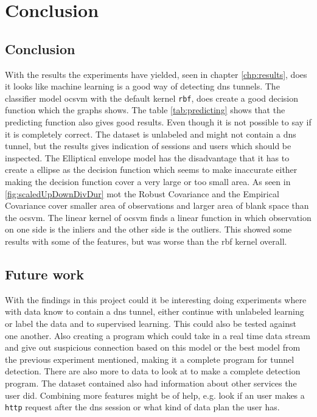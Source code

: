\chapter{Conclusion}
\label{chp:conclusion}

\section{Conclusion}
With the results the experiments have yielded, seen in chapter \ref{chp:results}, does it looks like machine learning is a good way of detecting \gls{dns} tunnels. The classifier model \gls{ocsvm} with the default kernel \texttt{rbf}, does create a good decision function which the graphs shows. The table \ref{tab:predicting} shows that the predicting function also gives good results. Even though it is not possible to say if it is completely correct. The dataset is unlabeled and might not contain a \gls{dns} tunnel, but the results gives indication of sessions and users which should be inspected. The Elliptical envelope model has the disadvantage that it has to create a ellipse as the decision function which seems to make inaccurate either making the decision function cover a very large or too small area. As seen in \ref{fig:scaledUpDownDivDur} mot the Robust Covariance and the Empirical Covariance cover smaller area of observations and larger area of blank space than the \gls{ocsvm}. The linear kernel of \gls{ocsvm} finds a linear function in which observation on one side is the inliers and the other side is the outliers. This showed some results with some of the features, but was worse than the rbf kernel overall.


\section{Future work}
With the findings in this project could it be interesting doing experiments where with data know to contain a \gls{dns} tunnel, either continue with unlabeled learning or label the data and to supervised learning. This could also be tested against one another. Also creating a program which could take in a real time data stream and give out suspicious connection based on this model or the best model from the previous experiment mentioned, making it a complete program for tunnel detection. There are also more to data to look at to make a complete detection program. The dataset contained also had information about other services the user did. Combining more features might be of help, e.g. look if an user makes a \texttt{http} request after the \gls{dns} session or what kind of data plan the user has. 